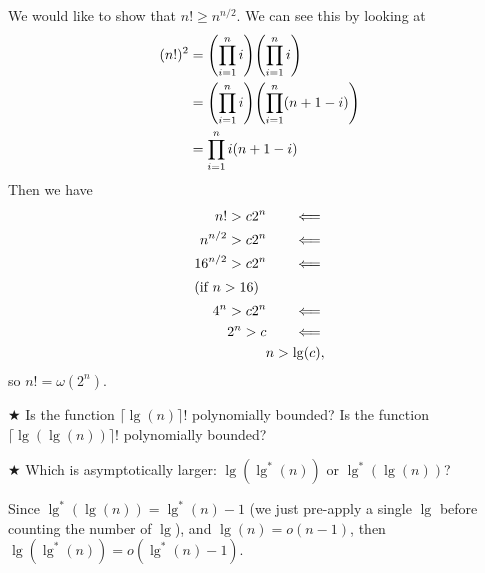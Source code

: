 \documentclass[Chapter03]{subfiles}
\begin{document}
\begin{enumerate}
\begin{answer}
			We would like to show that $n! \geq n^{n/2}$. We can see this by looking at
			\begin{align*}
				(n!)^2 &= \qty(\prod_{i = 1}^n i) \qty(\prod_{i = 1}^n i)\\
					&= \qty(\prod_{i = 1}^n i) \qty(\prod_{i = 1}^n (n + 1 - i))\\
					&= \prod_{i = 1}^n i(n + 1 - i)\\
			\end{align*}
			Then we have
			\begin{align*}
				n! > c2^n \tag*{$\impliedby$}\\
				n^{n/2} > c2^n \tag*{$\impliedby$}\\
				16^{n/2} > c2^n \tag*{$\impliedby$}\\
				\shortintertext{(if $n > 16$)}
				4^n > c2^n \tag*{$\impliedby$}\\
				2^n > c \tag*{$\impliedby$}\\
				n > \lg(c),
			\end{align*}
			so $n! = \omega(2^n)$.
		\end{answer}

		\item $\bigstar$ Is the function $\lceil \lg(n) \rceil !$ polynomially bounded? Is the function $\lceil \lg(\lg(n)) \rceil !$ polynomially bounded?


\end{answer}
\end{enumerate}
\end{document}
